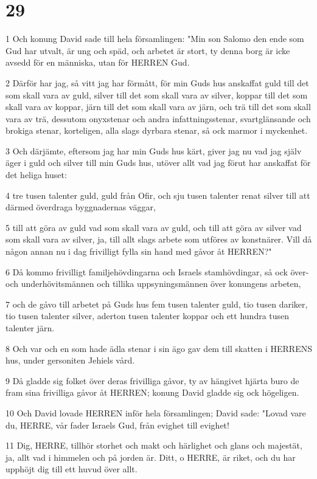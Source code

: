 \chapter{29}

\par 1 Och konung David sade till hela församlingen: "Min son Salomo den ende som Gud har utvalt, är ung och späd, och arbetet är stort, ty denna borg är icke avsedd för en människa, utan för HERREN Gud.
\par 2 Därför har jag, så vitt jag har förmått, för min Guds hus anskaffat guld till det som skall vara av guld, silver till det som skall vara av silver, koppar till det som skall vara av koppar, järn till det som skall vara av järn, och trä till det som skall vara av trä, dessutom onyxstenar och andra infattningsstenar, svartglänsande och brokiga stenar, korteligen, alla slags dyrbara stenar, så ock marmor i myckenhet.
\par 3 Och därjämte, eftersom jag har min Guds hus kärt, giver jag nu vad jag själv äger i guld och silver till min Guds hus, utöver allt vad jag förut har anskaffat för det heliga huset:
\par 4 tre tusen talenter guld, guld från Ofir, och sju tusen talenter renat silver till att därmed överdraga byggnadernas väggar,
\par 5 till att göra av guld vad som skall vara av guld, och till att göra av silver vad som skall vara av silver, ja, till allt slags arbete som utföres av konstnärer. Vill då någon annan nu i dag frivilligt fylla sin hand med gåvor åt HERREN?"
\par 6 Då kommo frivilligt familjehövdingarna och Israels stamhövdingar, så ock över- och underhövitsmännen och tillika uppsyningsmännen över konungens arbeten,
\par 7 och de gåvo till arbetet på Guds hus fem tusen talenter guld, tio tusen dariker, tio tusen talenter silver, aderton tusen talenter koppar och ett hundra tusen talenter järn.
\par 8 Och var och en som hade ädla stenar i sin ägo gav dem till skatten i HERRENS hus, under gersoniten Jehiels vård.
\par 9 Då gladde sig folket över deras frivilliga gåvor, ty av hängivet hjärta buro de fram sina frivilliga gåvor åt HERREN; konung David gladde sig ock högeligen.
\par 10 Och David lovade HERREN inför hela församlingen; David sade: "Lovad vare du, HERRE, vår fader Israels Gud, från evighet till evighet!
\par 11 Dig, HERRE, tillhör storhet och makt och härlighet och glans och majestät, ja, allt vad i himmelen och på jorden är. Ditt, o HERRE, är riket, och du har upphöjt dig till ett huvud över allt.
